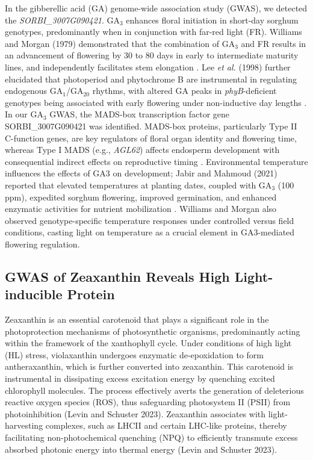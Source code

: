 \documentclass[10pt,letterpaper]{article}
\begin{document}
In the gibberellic acid (GA) genome-wide association study (GWAS), we detected the \textit{SORBI\_3007G090421}. GA\(_3\) enhances floral initiation in short-day sorghum genotypes, predominantly when in conjunction with far-red light (FR). Williams and Morgan (1979) demonstrated that the combination of GA\(_3\) and FR results in an advancement of flowering by 30 to 80 days in early to intermediate maturity lines, and independently facilitates stem elongation \citep{Williams1979}. Lee \emph{et al.} (1998) further elucidated that photoperiod and phytochrome B are instrumental in regulating endogenous GA\(_1\)/GA\(_{20}\) rhythms, with altered GA peaks in \emph{phyB}-deficient genotypes being associated with early flowering under non-inductive day lengths \citep{Lee1998}. In our GA\(_3\) GWAS, the MADS-box transcription factor gene SORBI\_3007G090421 was identified. MADS-box proteins, particularly Type II C-function genes, are key regulators of floral organ identity and flowering time, whereas Type I MADS (e.g., \emph{AGL62}) affects endosperm development with consequential indirect effects on reproductive timing \citep{Paul2020}. Environmental temperature influences the effects of GA3 on development; Jabir and Mahmoud (2021) reported that elevated temperatures at planting dates, coupled with GA\(_3\) (100 ppm), expedited sorghum flowering, improved germination, and enhanced enzymatic activities for nutrient mobilization \citep{Jabir2021}. Williams and Morgan also observed genotype-specific temperature responses under controlled versus field conditions, casting light on temperature as a crucial element in GA3-mediated flowering regulation.


\subsection*{GWAS of Zeaxanthin Reveals High Light-inducible Protein}

Zeaxanthin is an essential carotenoid that plays a significant role in the photoprotection mechanisms of photosynthetic organisms, predominantly acting within the framework of the xanthophyll cycle. Under conditions of high light (HL) stress, violaxanthin undergoes enzymatic de-epoxidation to form antheraxanthin, which is further converted into zeaxanthin. This carotenoid is instrumental in dissipating excess excitation energy by quenching excited chlorophyll molecules. The process effectively averts the generation of deleterious reactive oxygen species (ROS), thus safeguarding photosystem II (PSII) from photoinhibition (Levin and Schuster 2023). Zeaxanthin associates with light-harvesting complexes, such as LHCII and certain LHC-like proteins, thereby facilitating non-photochemical quenching (NPQ) to efficiently transmute excess absorbed photonic energy into thermal energy (Levin and Schuster 2023).
\end{document}
